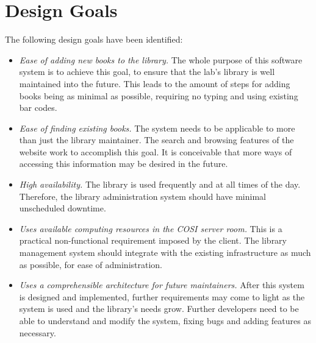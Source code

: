 \documentclass[a4paper, 10pt, oneside, draft]{article}
\begin{document}
\begin{usecase}



\end{usecase}

\newpage

\section{Design Goals}

The following design goals have been identified:

\begin{itemize}
    \item \textit{Ease of adding new books to the library.} The whole purpose
        of this software system is to achieve this goal, to ensure that the
        lab's library is well maintained into the future. This leads to the
        amount of steps for adding books being as minimal as possible,
        requiring no typing and using existing bar codes.
    \item \textit{Ease of finding existing books.} The system needs to be
        applicable to more than just the library maintainer. The search and
        browsing features of the website work to accomplish this goal. It is
        conceivable that more ways of accessing this information may be
        desired in the future.
    \item \textit{High availability.} The library is used frequently and at
        all times of the day. Therefore, the library administration system
        should have minimal unscheduled downtime.
    \item \textit{Uses available computing resources in the COSI server room.}
        This is a practical non-functional requirement imposed by the client.
        The library management system should integrate with the existing
        infrastructure as much as possible, for ease of administration.
    \item \textit{Uses a comprehensible architecture for future maintainers.}
        After this system is designed and implemented, further requirements
        may come to light as the system is used and the library's needs grow.
        Further developers need to be able to understand and modify the
        system, fixing bugs and adding features as necessary.
\end{itemize}
\end{document}
